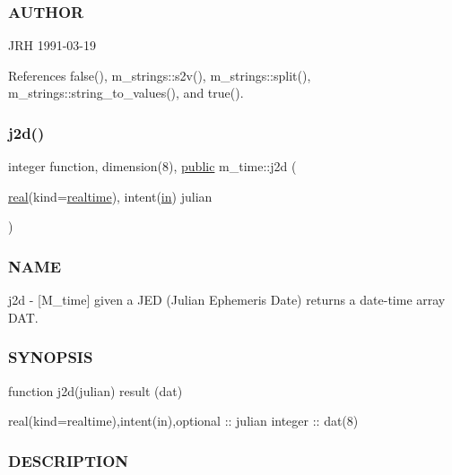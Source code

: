 \begin{DoxyVerb}
\subsubsection*{A\+U\+T\+H\+OR}

J\+RH 1991-\/03-\/19 

References false(), m\+\_\+strings\+::s2v(), m\+\_\+strings\+::split(), m\+\_\+strings\+::string\+\_\+to\+\_\+values(), and true().

\mbox{\label{namespacem__time_a3ad5cad6df02c53e0429c3602a072e3c}} 
\subsubsection{\texorpdfstring{j2d()}{j2d()}}
{\footnotesize\ttfamily integer function, dimension(8), \hyperlink{M__stopwatch_83_8txt_a2f74811300c361e53b430611a7d1769f}{public} m\+\_\+time\+::j2d (\begin{DoxyParamCaption}\item[{\hyperlink{read__watch_83_8txt_abdb62bde002f38ef75f810d3a905a823}{real}(kind=\hyperlink{namespacem__time_ac10ea9e8d59ec74eaa7d89f2517d7422}{realtime}), intent(\hyperlink{M__journal_83_8txt_afce72651d1eed785a2132bee863b2f38}{in})}]{julian }\end{DoxyParamCaption})}



\subsubsection*{N\+A\+ME}

j2d -\/ \mbox{[}M\+\_\+time\mbox{]} given a J\+ED (Julian Ephemeris Date) returns a date-\/time array D\+AT. 

\subsubsection*{S\+Y\+N\+O\+P\+S\+IS}

\begin{DoxyVerb}function j2d(julian) result (dat)

 real(kind=realtime),intent(in),optional :: julian
 integer                                 :: dat(8)
\end{DoxyVerb}


\subsubsection*{D\+E\+S\+C\+R\+I\+P\+T\+I\+ON}


\end{DoxyVerb}
